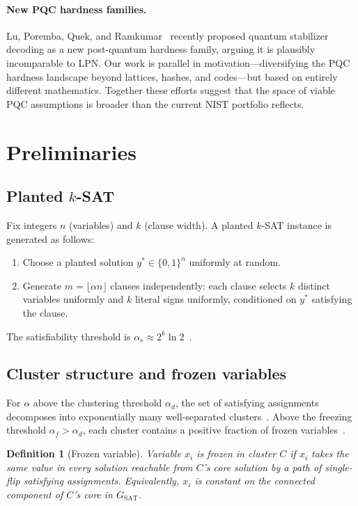 \documentclass[11pt]{article}
\newtheorem{definition}[theorem]{Definition}
\begin{document}
\paragraph{New PQC hardness families.}
Lu, Poremba, Quek, and Ramkumar~\cite{LPQR26} recently proposed quantum stabilizer decoding as a new post-quantum hardness family, arguing it is plausibly incomparable to LPN.  Our work is parallel in motivation---diversifying the PQC hardness landscape beyond lattices, hashes, and codes---but based on entirely different mathematics.  Together these efforts suggest that the space of viable PQC assumptions is broader than the current NIST portfolio reflects.


\section{Preliminaries}

\subsection{Planted $k$-SAT}
Fix integers $n$ (variables) and $k$ (clause width).  A planted $k$-SAT instance is generated as follows:
\begin{enumerate}
\item Choose a planted solution $y^* \in \{0,1\}^n$ uniformly at random.
\item Generate $m = \lfloor \alpha n \rfloor$ clauses independently: each clause selects $k$ distinct variables uniformly and $k$ literal signs uniformly, conditioned on $y^*$ satisfying the clause.
\end{enumerate}
The satisfiability threshold is $\alpha_s \approx 2^k \ln 2$~\cite{DSS22}.

\subsection{Cluster structure and frozen variables}
For $\alpha$ above the clustering threshold $\alpha_d$, the set of satisfying assignments decomposes into exponentially many well-separated clusters~\cite{DSS22,ACO08}.  Above the freezing threshold $\alpha_f > \alpha_d$, each cluster contains a positive fraction of frozen variables~\cite{ART09,CZ12}.

\begin{definition}[Frozen variable]\label{def:frozen}
Variable $x_i$ is frozen in cluster $C$ if $x_i$ takes the same value in every solution reachable from $C$'s core solution by a path of single-flip satisfying assignments.  Equivalently, $x_i$ is constant on the connected component of $C$'s core in $G_{\mathrm{SAT}}$.
\end{definition}
\end{document}
